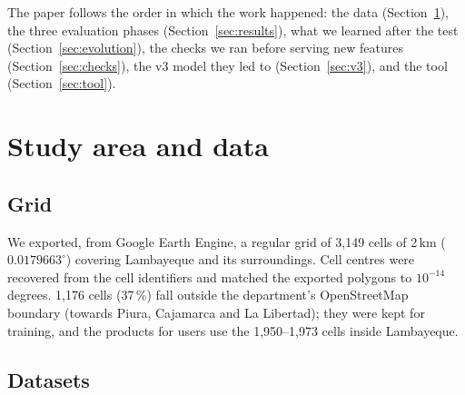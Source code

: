 \documentclass[11pt,a4paper]{article}
\begin{document}
\noindent The paper follows the order in which the work happened: the data (Section~\ref{sec:data}), the three
evaluation phases (Section~\ref{sec:results}), what we learned after the test (Section~\ref{sec:evolution}), the checks
we ran before serving new features (Section~\ref{sec:checks}), the v3 model they led to (Section~\ref{sec:v3}), and the
tool (Section~\ref{sec:tool}).

\section{Study area and data}\label{sec:data}

\subsection{Grid}
We exported, from Google Earth Engine, a regular grid of 3,149 cells of 2\,km ($0.0179663^\circ$) covering Lambayeque and
its surroundings. Cell centres were recovered from the cell identifiers and matched the exported polygons to
$10^{-14}$ degrees. 1,176 cells (37\,\%) fall outside the department's OpenStreetMap boundary (towards Piura, Cajamarca
and La Libertad); they were kept for training, and the products for users use the 1,950--1,973 cells inside Lambayeque.

\subsection{Datasets}
\end{document}
